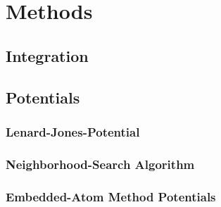 \chapter{Methods}
\begin{comment}
	0. Verlet Step
	1. Describe the Lenard Jones Potential
	2. Describe the Berendsen Thermostat
	3. Describe the Gupta 
	
\end{comment}
\begin{comment}
	Atoms are discreticed into the Postitions, Velocities and Forces 
	Second propagate the atom in the discriticed realm given constant Forces
		-> Velocity-Verlet Integration
	
	Compute Forces somehow
	-> Potentials
	LJ Potential 
	Gupta Potential
	
	Thermodynamic Effects
	Berendsen Thermostat
		->Gentle Way of resealing the Velocities
		
\end{comment}

\section{Integration}
\section{Potentials}
\subsection{Lenard-Jones-Potential}
\subsection{Neighborhood-Search Algorithm}
\subsection{Embedded-Atom Method Potentials}